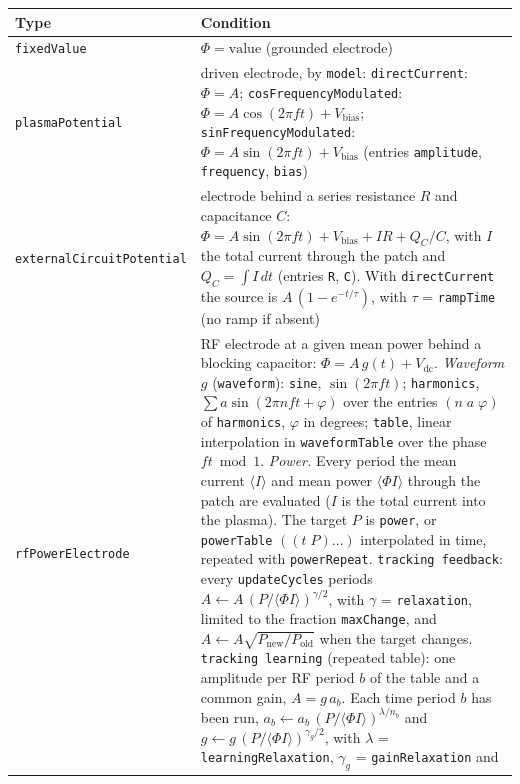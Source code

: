 \documentclass[11pt,a4paper]{article}
\newcommand{\kw}[1]{\texttt{#1}}
\begin{document}
\begin{longtable}{@{}L{4.9cm}L{10.3cm}@{}}
\toprule
Type & Condition \\
\midrule
\endhead
\bottomrule
\endfoot
\kw{fixedValue} & $\Phi=\text{value}$ (grounded electrode) \\[3pt]
\kw{plasmaPotential} & driven electrode, by \kw{model}:\newline
  \kw{directCurrent}: $\Phi=A$;\newline
  \kw{cosFrequencyModulated}: $\Phi=A\cos(2\pi f t)+V_\mathrm{bias}$;\newline
  \kw{sinFrequencyModulated}: $\Phi=A\sin(2\pi f t)+V_\mathrm{bias}$\newline
  (entries \kw{amplitude}, \kw{frequency}, \kw{bias}) \\[3pt]
\kw{externalCircuitPotential} & electrode behind a series resistance $R$ and capacitance $C$:
  $\Phi=A\sin(2\pi f t)+V_\mathrm{bias}+I R+Q_C/C$, with $I$ the total
  current through the patch and $Q_C=\int I\,dt$ (entries \kw{R}, \kw{C}).
  With \kw{directCurrent} the source is $A\,(1-e^{-t/\tau})$, with
  $\tau$ = \kw{rampTime} (no ramp if absent) \\[3pt]
\kw{rfPowerElectrode} & RF electrode at a given mean power behind a
  blocking capacitor: $\Phi=A\,g(t)+V_\mathrm{dc}$.\newline
  \emph{Waveform} $g$ (\kw{waveform}): \kw{sine}, $\sin(2\pi f t)$;
  \kw{harmonics}, $\sum a\sin(2\pi n f t+\varphi)$ over the entries
  $(n\;a\;\varphi)$ of \kw{harmonics}, $\varphi$ in degrees; \kw{table},
  linear interpolation in \kw{waveformTable} over the phase $ft \bmod 1$.\newline
  \emph{Power.} Every period the mean current $\langle I\rangle$ and mean
  power $\langle \Phi I\rangle$ through the patch are evaluated ($I$ is the
  total current into the plasma). The target $P$ is \kw{power}, or
  \kw{powerTable} $((t\;P)\dots)$ interpolated in time, repeated with
  \kw{powerRepeat}. \kw{tracking feedback}: every \kw{updateCycles} periods
  $A\leftarrow A\,(P/\langle\Phi I\rangle)^{\gamma/2}$, with $\gamma$ =
  \kw{relaxation}, limited to the fraction \kw{maxChange}, and
  $A\leftarrow A\sqrt{P_\mathrm{new}/P_\mathrm{old}}$ when the target
  changes. \kw{tracking learning} (repeated table): one amplitude per RF
  period $b$ of the table and a common gain, $A=g\,a_b$. Each time period
  $b$ has been run, $a_b\leftarrow a_b\,(P/\langle\Phi I\rangle)^{\lambda/n_b}$
  and $g\leftarrow g\,(P/\langle\Phi I\rangle)^{\gamma_g/2}$, with
  $\lambda$ = \kw{learningRelaxation}, $\gamma_g$ = \kw{gainRelaxation} and

\end{longtable}
\end{document}
